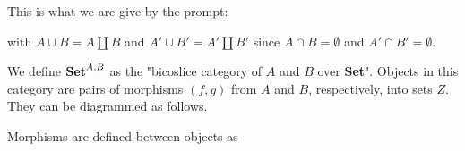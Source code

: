 \documentclass[12pt, letterpaper, twoside]{report}
\begin{document}
This is what we are give by the prompt:


with $A \cup B = A \coprod B$ and $A' \cup B' = A' \coprod B'$ since $A \cap B = \emptyset$ and $A' \cap B' = \emptyset$.


We define $\text{\textbf{Set}}^{A,B}$ as the "bicoslice category of $A$ and $B$ over \textbf{Set}". Objects in this category are pairs of morphisms $(f,g)$ from $A$ and $B$, respectively, into sets $Z$. They can be diagrammed as follows.


Morphisms are defined between objects as

\end{document}
